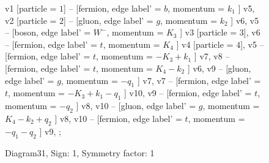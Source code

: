 \documentclass{revtex4}
\begin{document}
\begin{figure}[!htb]
\begin{center}
{    %
v1 [particle = \(1\)] -- [fermion, edge label' = \(b\), momentum = \(k_{1}\) ] v5, 
v2 [particle = \(2\)] -- [gluon, edge label' = \(g\), momentum = \(k_{2}\) ] v6, 
v5 -- [boson, edge label' = \(W^{-}\), momentum = \(K_{3}\) ] v3 [particle = \(3\)], 
v6 -- [fermion, edge label' = \(t\), momentum = \(K_{4}\) ] v4 [particle = \(4\)], 
v5 -- [fermion, edge label' = \(t\), momentum = \(-K_{3} + k_{1}\) ] v7, 
v8 -- [fermion, edge label' = \(t\), momentum = \(K_{4} - k_{2}\) ] v6, 
v9 -- [gluon, edge label' = \(g\), momentum = \(-q_{1}\) ] v7, 
v7 -- [fermion, edge label' = \(t\), momentum = \(-K_{3} + k_{1} - q_{1}\) ] v10, 
v9 -- [fermion, edge label' = \(t\), momentum = \(-q_{2}\) ] v8, 
v10 -- [gluon, edge label' = \(g\), momentum = \(K_{4} - k_{2} + q_{2}\) ] v8, 
v10 -- [fermion, edge label' = \(t\), momentum = \(-q_{1} - q_{2}\) ] v9, 
};
\end{center}
\caption{Diagram31, Sign: 1, Symmetry factor: 1}
\end{figure}
\newpage
\end{document}
